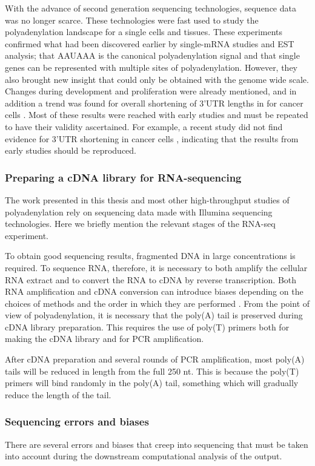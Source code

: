 With the advance of second generation sequencing technologies, sequence data
was no longer scarce. These technologies were fast used to study the
polyadenylation landscape for a single cells and tissues. These experiments
confirmed what had been discovered earlier by single-mRNA studies and EST
analysis; that AAUAAA is the canonical polyadenylation signal and that single
genes can be represented with multiple sites of polyadenylation. However, they
also brought new insight that could only be obtained with the genome wide
scale. Changes during development and proliferation were already mentioned, and
in addition a trend was found for overall shortening of 3'UTR lengths in for
cancer cells \cite{mayr_widespread_2009}. Most of these results were
reached with early studies and must be repeated to have their validity
ascertained. For example, a recent study did not find evidence for 3'UTR
shortening in cancer cells \cite{fu_differential_2011}, indicating that the
results from early studies should be reproduced.

\subsubsection{Preparing a cDNA library for RNA-sequencing}
The work presented in this thesis and most other high-throughput studies of
polyadenylation rely on sequencing data made with Illumina sequencing
technologies. Here we briefly mention the relevant stages of the RNA-seq
experiment.

To obtain good sequencing results, fragmented DNA in large concentrations is
required. To sequence RNA, therefore, it is necessary to both amplify the
cellular RNA extract and to convert the RNA to cDNA by reverse transcription.
Both RNA amplification and cDNA conversion can introduce biases depending on
the choices of methods and the order in which they are performed
\cite{wang_rna-seq:_2009}. From the point of view of polyadenylation, it is
necessary that the poly(A) tail is preserved during cDNA library preparation.
This requires the use of poly(T) primers both for making the cDNA library and
for PCR amplification.

After cDNA preparation and several rounds of PCR amplification, most poly(A)
tails will be reduced in length from the full 250 nt. This is because the
poly(T) primers will bind randomly in the poly(A) tail, something which will
gradually reduce the length of the tail.

\subsubsection{Sequencing errors and biases}
There are several errors and biases that creep into sequencing that must be
taken into account during the downstream computational analysis of the output.

